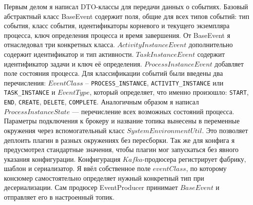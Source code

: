 Первым делом я написал DTO-классы для передачи данных о событиях. 
Базовый абстрактный класс BaseEvent содержит поля, общие для всех
типов событий: тип события, класс события, идентификаторы корневого и текущего 
экземпляра процесса, ключ определения процесса и время завершения. 
От BaseEvent я отнаследовал три конкретных класса. $ActivityInstanceEvent$          
дополнительно содержит идентификатор и тип активности. 
$TaskInstanceEvent$ содержит идентификатор задачи и ключ её        
определения. $ProcessInstanceEvent$ добавляет
поле состояния процесса. Для классификации событий были введены два перечисления: $EventClass$ -- \texttt{PROCESS\_INSTANCE}, \texttt{ACTIVITY\_INSTANCE}
или \texttt{TASK\_INSTANCE} и $EventType$, который определяет, что   
именно произошло: \texttt{START}, \texttt{END}, \texttt{CREATE}, \texttt{DELETE}, \texttt{COMPLETE}. Аналогичным образом я написал $ProcessInstanceState$ —
перечисление всех возможных состояний процесса.
Параметры подключения к брокеру и название топика вынесены в переменные        
окружения через вспомогательный класс $SystemEnvironmentUtil$. 
Это позволяет деплоить плагин в разных окружениях без пересборки.
Так же для конфига я предусмотрел стандартные значения, чтобы плагин мог запускаться без явного указания конфигурации.
Конфигурация $Kafka$-продюсера регистрирует фабрику, шаблон и
сериализатор. Я ввёл собственное поле $eventClass$, по которому консюмер самостоятельно определяет
нужный конкретный тип при десериализации. Сам продюсер EventProducer принимает $BaseEvent$ и  
отправляет его в настроенный топик.

